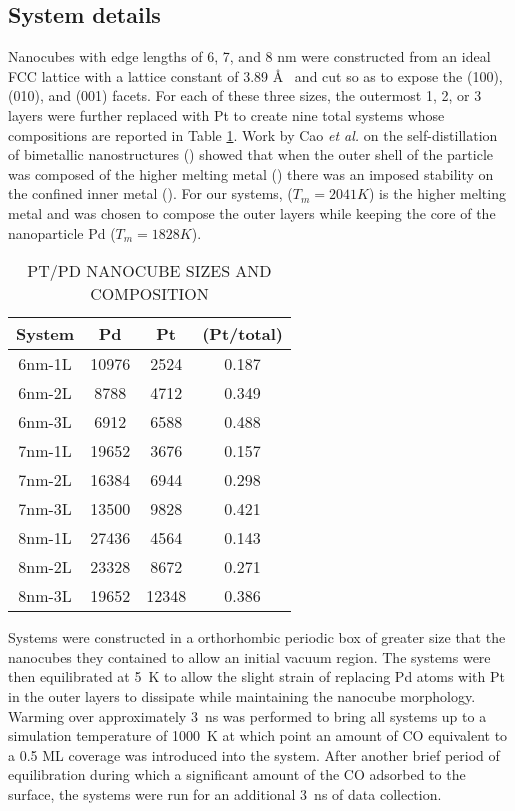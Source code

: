 \subsection{System details}
Nanocubes with edge lengths of 6, 7, and 8 nm were constructed from an ideal
 FCC lattice with a lattice constant of 3.89 \AA~  and cut so as to
expose the (100), (010), and (001) facets. For each of these three sizes, the
outermost 1, 2, or 3 layers were further replaced with Pt to create nine total
systems whose compositions are reported in Table \ref{tab:systems}. Work by Cao
{\it et al.}\citep{Cao:2010gf} on the self-distillation of bimetallic
nanostructures () showed that when the outer shell of the particle
was composed of the higher melting metal () there was an imposed
stability on the confined inner metal (). For our systems,  ($T_m
= 2041 K$) is the higher melting metal and was chosen to compose the outer
layers while keeping the core of the nanoparticle Pd ($T_m = 1828 K$). 

\begin{table}
  \caption{PT/PD NANOCUBE SIZES AND COMPOSITION}
  \centering
  \begin{threeparttable}
  \begin{tabular}{ c ccc }
  \hline
  \hline
  \textbf{System} & \textbf{Pd} & \textbf{Pt} &  \textbf{(Pt/total)} \\
  \hline
  6nm-1L & 10976 & 2524  & 0.187 \\
  6nm-2L & 8788  & 4712  & 0.349 \\
  6nm-3L & 6912  & 6588  & 0.488 \\
  7nm-1L & 19652 & 3676  & 0.157 \\
  7nm-2L & 16384 & 6944  & 0.298 \\
  7nm-3L & 13500 & 9828  & 0.421 \\
  8nm-1L & 27436 & 4564  & 0.143 \\
  8nm-2L & 23328 & 8672  & 0.271 \\
  8nm-3L & 19652 & 12348 & 0.386 \\
  \hline
  \hline
  \end{tabular}
  \end{threeparttable}
\label{tab:systems}
\end{table}

Systems were constructed in a orthorhombic periodic box of greater size that
the nanocubes they contained to allow an initial vacuum region. The systems were then 
equilibrated at 5~K to allow the slight strain of replacing Pd atoms with Pt in
the outer layers to dissipate while maintaining the nanocube morphology.
Warming over approximately 3~ns was performed to bring all systems up to a
simulation temperature of 1000~K at which point an amount of CO equivalent to a
0.5 ML coverage was introduced into the system.  After another brief period of
equilibration during which a significant amount of the CO adsorbed to the
surface, the systems were run for an additional 3~ns of
data collection.

